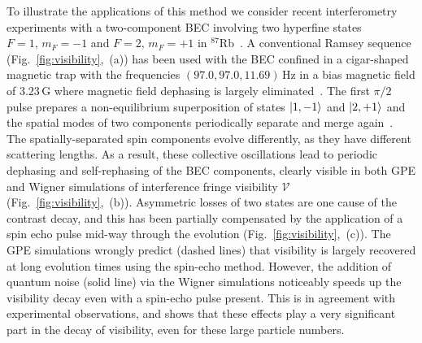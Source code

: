 \documentclass[aps,prl,twocolumn,showpacs,amsmath,amssymb,superscriptaddress,flushbottom,noraggedfooter]{revtex4-1}
\newcommand{\Rb}{$^{87}$Rb}
\newcommand{\figref}[1]{Fig.~\ref{#1}}
\newcommand{\ket}[1]{\mbox{\ensuremath{\vert #1 \rangle}}}
\begin{document}
To illustrate the applications of this method we consider recent interferometry
experiments with a two-component BEC involving two hyperfine states
${F=1,\, m_{F}=-1}$ and ${F=2,\, m_{F}=+1}$ in \Rb~\cite{Egorov2011}.
A conventional Ramsey sequence (\figref{fig:visibility},~(a)) has been used
with the BEC confined in a cigar-shaped magnetic trap with the frequencies $(97.0, 97.0, 11.69)\,\mathrm{Hz}$
in a bias magnetic field of $3.23\,\mathrm{G}$ where magnetic field dephasing is largely eliminated~\cite{Hall1998}.
The first $\pi/2$ pulse prepares a non-equilibrium superposition of states ${\ket{1,-1}}$ and ${\ket{2,+1}}$
and the spatial modes of two components periodically separate and merge again~\cite{Mertes2007}.
The spatially-separated spin components evolve differently, as they have
different scattering lengths.
As a result, these collective oscillations lead to periodic dephasing and
self-rephasing of the BEC components, clearly visible in both GPE and Wigner
simulations of interference fringe visibility
$\mathcal{V}$ (\figref{fig:visibility},~(b)).
Asymmetric losses of two states are one cause of the contrast decay, and
this has been partially compensated by the application of a spin echo pulse
mid-way through the evolution (\figref{fig:visibility},~(c)).
The GPE simulations wrongly predict (dashed lines) that visibility is largely
recovered at long evolution times using the spin-echo method.
However, the addition of quantum noise (solid line) via the Wigner simulations
noticeably speeds up the visibility decay even with a spin-echo pulse present.
This is in agreement with experimental observations, and shows that these
effects play a very significant part in the decay of visibility, even for
these large particle numbers.
\end{document}
